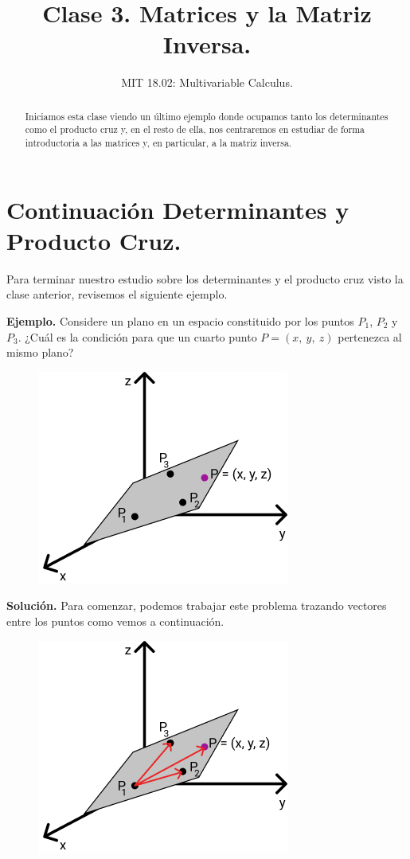 \documentclass[12pt]{article}
\title{Clase 3. Matrices y la Matriz Inversa.}
\author{MIT 18.02: Multivariable Calculus.}
\date{}
\begin{document}
\maketitle

\begin{abstract}
\noindent Iniciamos esta clase viendo un último ejemplo donde ocupamos tanto los determinantes como el producto cruz y, en el resto de ella, nos centraremos en estudiar de forma introductoria a las matrices y, en particular, a la matriz inversa.
\end{abstract}


\section{Continuación Determinantes y Producto Cruz.}

Para terminar nuestro estudio sobre los determinantes y el producto cruz visto la clase anterior, revisemos el siguiente ejemplo.

\textbf{Ejemplo.} Considere un plano en un espacio constituido por los puntos $P_{1}$, $P_{2}$ y $P_{3}$. ¿Cuál es la condición para que un cuarto punto $P = (x, \ y, \ z)$ pertenezca al mismo plano?

\begin{figure}[hbt!]
\centering
\includegraphics[scale=0.6]{img/ex-determ-cross-prod-1.jpg}
\end{figure}

\textbf{Solución.} Para comenzar, podemos trabajar este problema trazando vectores entre los puntos como vemos a continuación.

\newpage

\begin{figure}[hbt!]
\centering
\includegraphics[scale=0.6]{img/ex-determ-cross-prod-2.jpg}
\end{figure}
\end{document}
